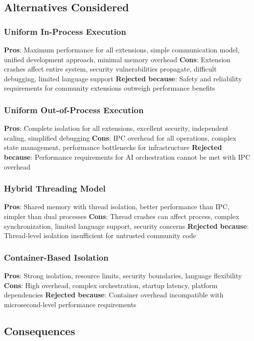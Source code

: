 \subsection*{Alternatives Considered}

\subsubsection*{Uniform In-Process Execution}
\textbf{Pros}: Maximum performance for all extensions, simple communication model, unified development approach, minimal memory overhead
\textbf{Cons}: Extension crashes affect entire system, security vulnerabilities propagate, difficult debugging, limited language support
\textbf{Rejected because}: Safety and reliability requirements for community extensions outweigh performance benefits

\subsubsection*{Uniform Out-of-Process Execution}
\textbf{Pros}: Complete isolation for all extensions, excellent security, independent scaling, simplified debugging
\textbf{Cons}: IPC overhead for all operations, complex state management, performance bottlenecks for infrastructure
\textbf{Rejected because}: Performance requirements for AI orchestration cannot be met with IPC overhead

\subsubsection*{Hybrid Threading Model}
\textbf{Pros}: Shared memory with thread isolation, better performance than IPC, simpler than dual processes
\textbf{Cons}: Thread crashes can affect process, complex synchronization, limited language support, security concerns
\textbf{Rejected because}: Thread-level isolation insufficient for untrusted community code

\subsubsection*{Container-Based Isolation}
\textbf{Pros}: Strong isolation, resource limits, security boundaries, language flexibility
\textbf{Cons}: High overhead, complex orchestration, startup latency, platform dependencies
\textbf{Rejected because}: Container overhead incompatible with microsecond-level performance requirements

\subsection*{Consequences}

